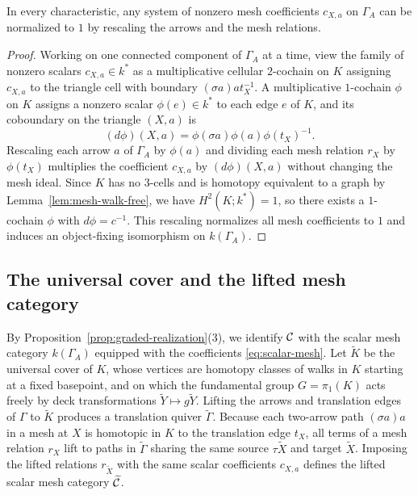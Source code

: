 \begin{lemma}
\label{lem:unit-mesh-coefficients}
In every characteristic, any system of nonzero mesh coefficients $c_{X,a}$ on
$\Gamma_A$ can be normalized to $1$ by rescaling the arrows and the mesh
relations.
\end{lemma}
\begin{proof}
Working on one connected component of $\Gamma_A$ at a time, view the family
of nonzero scalars $c_{X,a}\in k^*$ as a multiplicative cellular $2$-cochain
on $K$ assigning $c_{X,a}$ to the triangle cell with boundary
$(\sigma a)a t_X^{-1}$. A multiplicative $1$-cochain $\phi$ on $K$ assigns a
nonzero scalar $\phi(e)\in k^*$ to each edge $e$ of $K$, and its coboundary
on the triangle $(X,a)$ is
\[
 (d\phi)(X,a)=\phi(\sigma a)\phi(a)\phi(t_X)^{-1}.
\]
Rescaling each arrow $a$ of $\Gamma_A$ by $\phi(a)$ and dividing each mesh
relation $r_X$ by $\phi(t_X)$ multiplies the coefficient $c_{X,a}$ by
$(d\phi)(X,a)$ without changing the mesh ideal. Since $K$ has no $3$-cells
and is homotopy equivalent to a graph by Lemma~\ref{lem:mesh-walk-free}, we
have $H^2(K;k^*)=1$, so there exists a $1$-cochain $\phi$ with
$d\phi=c^{-1}$. This rescaling normalizes all mesh coefficients to $1$ and
induces an object-fixing isomorphism on $k(\Gamma_A)$.
\end{proof}

\subsection{The universal cover and the lifted mesh category}
\label{subsec:universal-cover}

By Proposition~\ref{prop:graded-realization}(3), we identify $\mathcal C$ with the
scalar mesh category $k(\Gamma_A)$ equipped with the coefficients
\eqref{eq:scalar-mesh}. Let $\widetilde K$ be the universal cover of $K$,
whose vertices are homotopy classes of walks in $K$ starting at a fixed
basepoint, and on which the fundamental group $G=\pi_1(K)$ acts freely by
deck transformations $\widetilde Y\mapsto g\widetilde Y$. Lifting the arrows
and translation edges of $\Gamma$ to $\widetilde K$ produces a translation
quiver $\widetilde\Gamma$. Because each two-arrow path $(\sigma a)a$ in a
mesh at $X$ is homotopic in $K$ to the translation edge $t_X$, all terms of
a mesh relation $r_X$ lift to paths in $\widetilde\Gamma$ sharing the same
source $\tau\widetilde X$ and target $\widetilde X$. Imposing the lifted
relations $r_{\widetilde X}$ with the same scalar coefficients $c_{X,a}$
defines the lifted scalar mesh category $\widetilde{\mathcal C}$.

